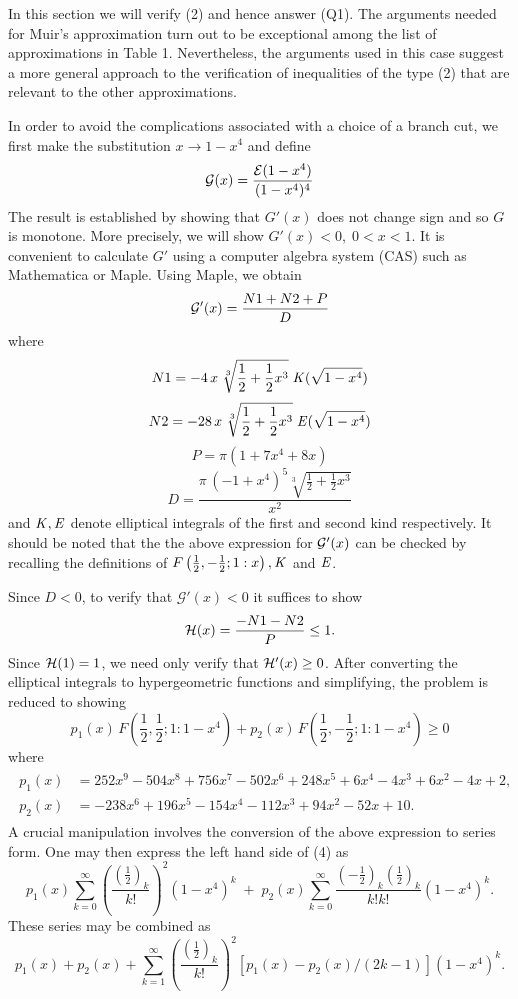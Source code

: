 \documentclass[12pt]{article}
\begin{document}
In this section we will verify (2) and hence answer (Q1). The arguments 
needed for Muir's
approximation turn out to be exceptional among the list of approximations 
in Table 1.  Nevertheless,
the arguments used in this case suggest a more general approach to the  
verification of inequalities
of the type (2) that are relevant to the other approximations.

In order to avoid the complications associated with a choice of a branch 
cut, we first make the
substitution $x \rightarrow 1-x^4$  and define
\begin{equation} 
{\cal G}(x)= \displaystyle{\frac{{\cal E}(1-x^4)}{(1-x^4) ^4}}
\end{equation}
The result is established by showing that $G'(x)$ does not change sign 
and so $G$ is monotone. More
precisely, we will show
$G'(x)<0, \; 0<x<1$.  It is convenient to calculate
$G'$ using a computer algebra system (CAS) such as Mathematica or Maple.  
Using Maple,  we obtain 
$$ 
{\cal G}'(x)= \frac{N1+ N2+P}{D} 
$$ 
where
$$
 N1 = -4\,x \; \sqrt[3]{\frac{1}{2}+\frac{1}{2}{x}^{3}} \; {\it 
K}(\sqrt{1-{x}^{4}})
$$
$$
N2= -28\, x\; \sqrt[3]{\frac{1}{2}+\frac{1}{2}{x}^{3}}\; {\it 
E}(\sqrt{1-{x}^{4}})
$$
$$ 
P= \pi(1+ 7{x}^{4}+8x)
$$
$$
 D =\frac{ \pi \,\left 
(-1+{x}^{4}\right)^{5}\sqrt[3]{\frac{1}{2}+\frac{1}{2}{x}^{3}}}{x^2}
$$ 
and ${\it K}, {\it E}$ denote elliptical integrals of the first and 
second
kind respectively.  It should be noted that the the
above expression for ${\cal G}'(x)$ can be  checked by recalling the  
definitions
of $ F\left(\frac{1}{2},-\frac{1}{2};1:x\right), {\it K}$ and  ${\it 
E}$.

Since  $D<0$, to verify that $ \mathcal{ G}'(x) < 0 $ it suffices to show 
$$ 
 {\cal H}(x)= \frac{-N1-N2}{P} \leq 1.
$$  
 Since ${\cal H}(1)=1$, we need only verify that
${\cal H}'(x) \geq 0 $.  After converting the elliptical integrals  to  
hypergeometric
functions and simplifying,  the problem is reduced to showing
\begin{equation}
p_1(x)\, F\left(\frac{1}{2},\frac{1}{2};1:1-x^4\right) + p_2(x)\, 
F\left(\frac{1}{2},
-\frac{1}{2};1:1-x^4\right)  \geq 0
\end{equation}
where
\begin{align*}
\begin{split}  p_1(x) & =
252{x}^{9} -504{x}^{8} + 756{x}^{7} -502{x}^{6}+ 
248{x}^{5}+6{x}^{4}-4{x}^{3}+6{x}^{2} - 4x+2,\\[1ex]
 p_2(x) &= -238{x}^{6} +196{x}^{5}-154{x}^{4}-112{x}^{3}+94{x}^{2} 
-52x+10.
\end{split}
\end{align*} 
A crucial manipulation involves the  conversion of the above expression 
to  series form. One may then
express the left hand side of (4) as
$$ 
p_1(x) \sum_{k=0}^{\infty} \left(\frac{(  \frac{1}{2}) _k }{ k!}\right)^2
(1-x^4)^k  
 \; + \;  p_2(x)  \sum_{k=0}^{\infty} \frac{ ( -\frac{1}{2}) _k ( 
\frac{1}{2})_k}{k!
k!} (1-x^4)^k.
$$ 
These series may be combined as
\begin{equation}
p_1(x) + p_2(x) + \sum_{k=1}^{\infty} \left(\frac{(  \frac{1}{2}) _k }{
k!}\right)^2 \left [ p_1(x)-p_2(x)/(2k-1) \right ] (1-x^4)^k.  
\end{equation}
\end{document}
